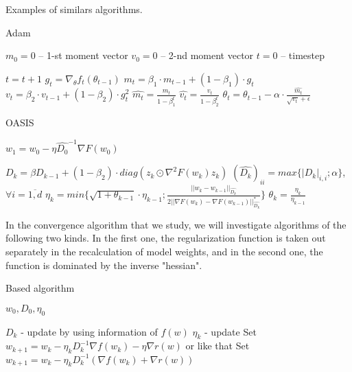 \documentclass{article}
\begin{document}
Examples of similars algorithms.
\begin{algorithm}[H]
	\caption{Adam}\label{alg:Adam}
		\begin{algorithmic}
		\State $m_0 = 0$ -- 1-st moment vector
		\State $v_0 = 0$ -- 2-nd moment vector
		\State $t = 0$ -- timestep
		
			\State $t = t+1$
			\State $g_t = \nabla_{\theta} f_t(\theta_{t-1})$
			\State $m_t = \beta_1 \cdot m_{t-1} + (1 - \beta_1) \cdot g_t$
			\State $v_t = \beta_2 \cdot v_{t-1} + (1 - \beta_2) \cdot g_t^2$
			\State $\hat{m_t} = \frac{m_t}{1-\beta_1^t}$
			\State $\hat{v_t} = \frac{v_t}{1-\beta_2^t}$
			\State $\theta_t = \theta_{t-1} - \alpha \cdot \frac{\hat{m_t}}{\sqrt{v_t} + \epsilon}$
		\EndWhile
	\end{algorithmic}
	\end{algorithm}
	
	\begin{algorithm}[H]
	\caption{OASIS}\label{alg:OASIS}
	\begin{algorithmic}
		\Require{$w_0, \eta_0, D_0, \theta_0 = + \infty$}    
		\State $w_1 = w_0 - \eta \hat{D_0}^{-1} \nabla F(w_0)$
	
		\For{$k = 1, 2, ...$}
		\State $D_k = \beta D_{k-1} + (1-\beta_2) \cdot diag\left( z_k \odot \nabla^2 F(w_k) z_k \right)$
		\State $(\hat{D_k})_{ii} = max \{|D_k|_{i, i} ; \alpha \}$, $\forall i = \overline{1, d}$
		\State $\eta_k = min \{ \sqrt{1 + \theta_{k-1}} \cdot \eta_{k-1}; \frac{||w_k - w_{k-1}||_{\hat{D_k}}}{2 ||\nabla F(w_k) - \nabla F(w_{k-1}) ||_{\hat{D_k}}^* } \}$
		\State $\theta_k = \frac{\eta_k}{\eta_{k-1}}$
		\EndFor
		
	\end{algorithmic}
\end{algorithm}
\fi

In the convergence algorithm that we study, we will investigate algorithms of the following two kinds. In the first one, the regularization function is taken out separately in the recalculation of model weights, and in the second one, the function is dominated by the inverse "hessian".

\begin{algorithm}[H]
	\caption{Based algorithm}\label{alg:Based}
	$w_0, D_0, \eta_0$
	\begin{algorithmic}
		\State $D_k$ - update by using information of $f(w)$
		\State $\eta_k$ - update
		\State Set $w_{k+1} = w_k - \eta_k D_k^{-1} \nabla f(w_k) - \eta \nabla r(w)$ 
		\State or like that
		\State Set $w_{k+1} = w_k - \eta_k D_k^{-1} (\nabla f(w_k) + \nabla r(w))$
		\EndFor
	\end{algorithmic}
\end{algorithm}
\end{document}
